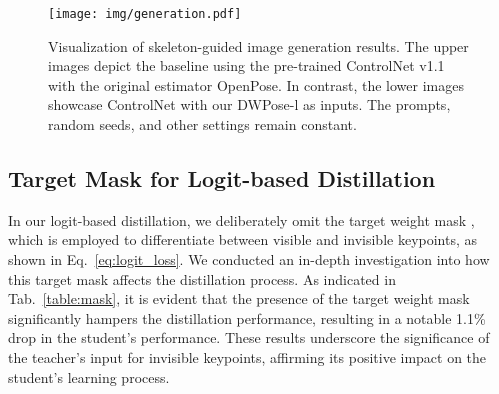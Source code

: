 \documentclass[10pt,twocolumn,letterpaper]{article}
\begin{document}
\begin{figure*}[h]
    \centering
    \texttt{[image: img/generation.pdf]}
    \caption{Visualization of skeleton-guided image generation results. The upper images depict the baseline using the pre-trained ControlNet v1.1 with the original estimator OpenPose. In contrast, the lower images showcase ControlNet with our DWPose-l as inputs. The prompts, random seeds, and other settings remain constant.}
    \label{fig:generation}
    \vspace{-0.2cm}
\end{figure*}


\begin{table*}[h]
\begin{center}
\setlength{\tabcolsep}{12 pt}
\end{center}
\caption{Comparison of pose estimation speed with OpenPose. The table displays the average time cost (in seconds) for inferring an image on an Nvidia RTX 3090 with varying numbers of persons present. We use YOLOX-l and DWPose-l to test the speed.}
\label{table:speed}
\end{table*}


\subsection{Target Mask for Logit-based Distillation}
\label{sec:mask}

In our logit-based distillation, we deliberately omit the target weight mask , which is employed to differentiate between visible and invisible keypoints, as shown in Eq.~\ref{eq:logit_loss}. We conducted an in-depth investigation into how this target mask affects the distillation process. As indicated in Tab.~\ref{table:mask}, it is evident that the presence of the target weight mask significantly hampers the distillation performance, resulting in a notable 1.1\% drop in the student's performance. These results underscore the significance of the teacher's input for invisible keypoints, affirming its positive impact on the student's learning process.
\end{document}
